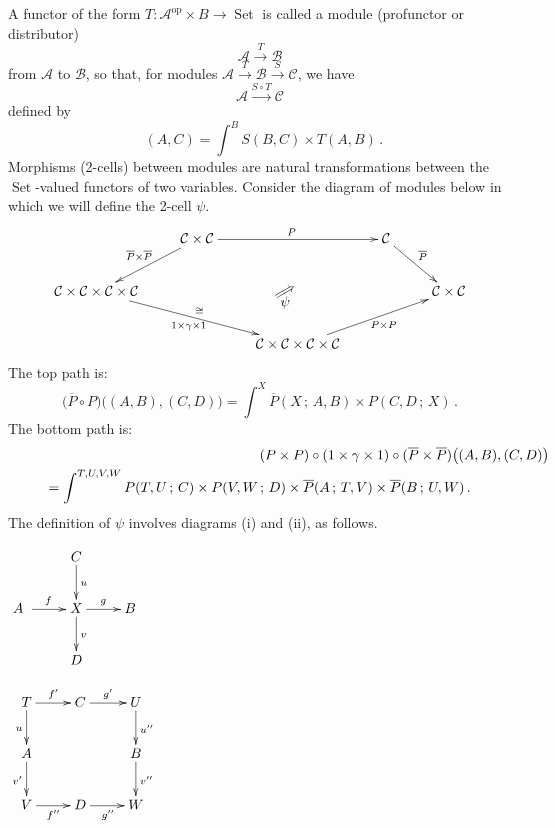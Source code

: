 \documentclass[a4paper,12pt]{article}
\theoremstyle{definition}
\theoremstyle{fact}
\theoremstyle{genquest}
\theoremstyle{step}
\newcommand{\catA}{\mathcal{A}}
\newcommand{\catB}{\mathcal{B}}
\newcommand{\catC}{\mathcal{C}}
\newcommand{\Set}{\operatorname{Set}}
\newcommand{\op}{\operatorname{op}}
\newcommand{\longto}{\longrightarrow}
\begin{document}
A functor of the form $T : \catA^{\op}  \times B \to \Set $ is called a module (profunctor or distributor)
\[
\catA \stackrel{T}{\longto} \catB
\]
from $\catA$ to $\catB$, so that, for modules $\catA \stackrel{T}{\longto} \catB \stackrel{S}{\longto} \catC$, 
we have
\[
\catA \stackrel{S\circ T}{\longto} \catC
\]
defined by
\[
\mathop{(S\circ T)}(A,C) = \int^B S (B,C) \times T(A,B)\,.
\]
Morphisms (2-cells) between modules are natural transformations between the $\Set $-valued functors of two variables. Consider the diagram of modules below in which we will define the 2-cell $\psi$. 
\[
\xymatrix{ & \catC \times \catC \ar[ld]_-{\overline P \times \overline P}  \ar[rr]^P  && \catC \ar[rd]^-{\overline P} 
\\
\catC \times \catC \times \catC \times \catC \ar[rrd]^{\cong}_-{1\times \gamma \times 1} 
 \ar@{}[rrrr]_-*{\psi}|-*{\textrm{\rotatebox{30}{$\Longrightarrow$}}} &&& & \catC \times \catC 
\\
&& \catC \times \catC \times \catC \times \catC \ar[rru]_-{P\times P} 
}
\]
The top path is:
\[
\bigl(\overline P \circ P) \bigl((A,B),(C,D)\bigr) = \int^X \overline P (X\,;\,A,B) \times P (C,D\,;\,X) \,.
\]
The bottom path is:
\begin{multline*}
\lefteqn{(P\times P) \circ (1 \times \gamma \times 1) \circ 
   \mathop{(\overline P \times  \overline P)} \bigl((A,B),(C,D)\bigr)} \\
= \int^{T,U,V,W} P(T,U\,;\,C) \times P(V,W\,;\,D) \times \overline P  (A\,;\,T,V) \times \overline P (B\,;\,U,W) \,.
\end{multline*}
The definition of $\psi$ involves diagrams (i) and (ii), as follows.

\noindent
\begin{inparaenum}[(i)]
\item %
$\xymatrix{
 & C  \ar[d]^u 
\\
A \ \ar[r]^f & X \ar[d]^v \ar[r]^g & B 
\\
 & D & & 
}$ 
\qquad\qquad
\item %
$  \xymatrix{
T \ar[d]_u \ar[r]^{f'} &C \ar[r]^{g'} &U\ar[d]^{u''}
\\
A\ar[d]_{v'} &&B  \ar[d]^{v''}
\\
V \ar[r]_{f''}  &D  \ar[r]_{g''} & W
\\
}$ 
\end{inparaenum}
\end{document}
